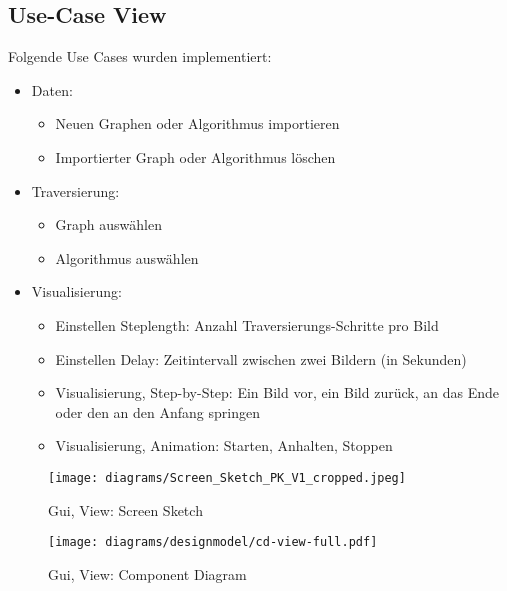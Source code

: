 \subsection{Use-Case View}
Folgende Use Cases wurden implementiert:
\begin{itemize}
  \item Daten:
  \begin{itemize}
    \item Neuen Graphen oder Algorithmus importieren
    \item Importierter Graph oder Algorithmus l\"oschen
  \end{itemize}
  \item Traversierung:
  \begin{itemize}
    \item Graph ausw\"ahlen
    \item Algorithmus ausw\"ahlen
  \end{itemize}
  \item Visualisierung:
  \begin{itemize}
      \item Einstellen Steplength: Anzahl Traversierungs-Schritte pro Bild
      \item Einstellen Delay: Zeitintervall zwischen zwei Bildern (in Sekunden)      
      \item Visualisierung, Step-by-Step: Ein Bild vor, ein Bild zur\"uck, an das Ende oder den an den Anfang springen
      \item Visualisierung, Animation: Starten, Anhalten, Stoppen
  \end{itemize}
\end{itemize}
% 
\begin{figure}[H]
    \centering
    \texttt{[image: diagrams/Screen\_Sketch\_PK\_V1\_cropped.jpeg]}
    \caption{Gui, View: Screen Sketch}
    \label{fig:gui-view-screen-sketch}
\end{figure}
% 
\begin{figure}[H]
    \centering
    \texttt{[image: diagrams/designmodel/cd-view-full.pdf]}
    \caption{Gui, View: Component Diagram}
    \label{fig:gui-view-cd}
\end{figure}